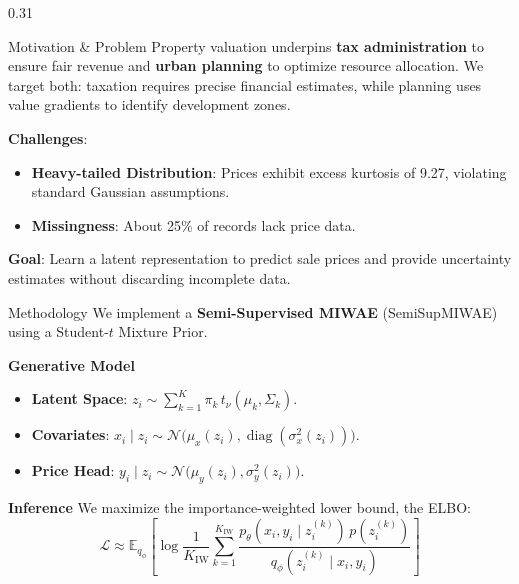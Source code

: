 \documentclass[final,t]{beamer}
\begin{document}
\begin{frame}{}
  \vspace{-1.5cm}
  
  \begin{columns}[t]
    \begin{column}{0.31\paperwidth}
      \begin{minipage}[t][0.79\paperheight][s]{\linewidth}
      \begin{block}{Motivation \& Problem}
        Property valuation underpins \textbf{tax administration} to ensure fair revenue and \textbf{urban planning} to optimize resource allocation. We target both: taxation requires precise financial estimates, while planning uses value gradients to identify development zones.
        
        \textbf{Challenges}:
        \begin{itemize}
          \item \textbf{Heavy-tailed Distribution}: Prices exhibit excess kurtosis of 9.27, violating standard Gaussian assumptions.
          \item \textbf{Missingness}: About 25\% of records lack price data.
        \end{itemize}

        \textbf{Goal}: Learn a latent representation to predict sale prices and provide uncertainty estimates without discarding incomplete data.
      \end{block}
      \vfill

      \begin{block}{Methodology}
        We implement a \textbf{Semi-Supervised MIWAE} (SemiSupMIWAE) using a Student-$t$ Mixture Prior.

        \textbf{Generative Model}
        \begin{itemize}
          \item \textbf{Latent Space}: $z_i \sim \sum_{k=1}^K \pi_k \, t_\nu(\mu_k, \Sigma_k)$.
          \item \textbf{Covariates}: $x_i \mid z_i \sim \mathcal{N}\big(\mu_x(z_i), \operatorname{diag}(\sigma^2_x(z_i))\big)$.
          \item \textbf{Price Head}: $y_i \mid z_i \sim \mathcal{N}\big(\mu_y(z_i), \sigma^2_y(z_i)\big)$.
        \end{itemize}

        \textbf{Inference}
        We maximize the importance-weighted lower bound, the ELBO:
        \[
        \mathcal{L} \approx \mathbb{E}_{q_\phi} \left[ \log \frac{1}{K_{\text{IW}}} \sum_{k=1}^{K_{\text{IW}}} \frac{p_\theta(x_i, y_i \mid z_i^{(k)}) \, p(z_i^{(k)})}{q_\phi(z_i^{(k)} \mid x_i, y_i)} \right]
        \]
      \end{block}
      \vfill


\end{minipage}
\end{column}
\end{columns}
\end{frame}
\end{document}

